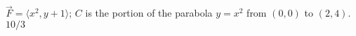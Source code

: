 {$\vec F = \langle x^2,y+1\rangle$; $C$ is the portion of the parabola $y=x^2$ from $(0,0)$ to $(2,4)$.
}
{$10/3$
}
